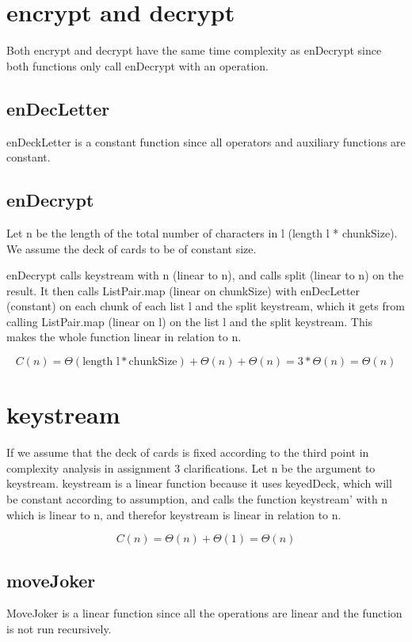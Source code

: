 \documentclass[12pt, a4paper]{article}
\begin{document}
\section{encrypt and decrypt}
Both encrypt and decrypt have the same time complexity as enDecrypt since both functions only call enDecrypt with an operation.

\subsection{enDecLetter}
enDeckLetter is a constant function since all operators and auxiliary functions are constant.

\subsection{enDecrypt}
Let n be the length of the total number of characters in l (length l * chunkSize). We assume the deck of cards to be of constant size.

enDecrypt calls keystream with n (linear to n), and calls split (linear to n) on the result. It then calls ListPair.map (linear on chunkSize) with enDecLetter (constant) on each chunk of each list l and the split keystream, which it gets from calling ListPair.map (linear on l) on the list l and the split keystream. This makes the whole function linear in relation to n.

$$C(n) = \Theta(\text{length l}*\text{chunkSize}) + \Theta(n) + \Theta(n) = 3 * \Theta(n) = \Theta(n)$$

\section{keystream}
If we assume that the deck of cards is fixed according to the third point in complexity analysis in assignment 3 clarifications. Let n be the argument to keystream.
keystream is a linear function because it uses keyedDeck, which will be constant according to assumption, and calls the function keystream' with n which is linear to n, and therefor keystream is linear in relation to n.

$$C(n) = \Theta(n) + \Theta(1) = \Theta(n)$$

\subsection{moveJoker}
MoveJoker is a linear function since all the operations are linear and the function is not run recursively.
\end{document}
